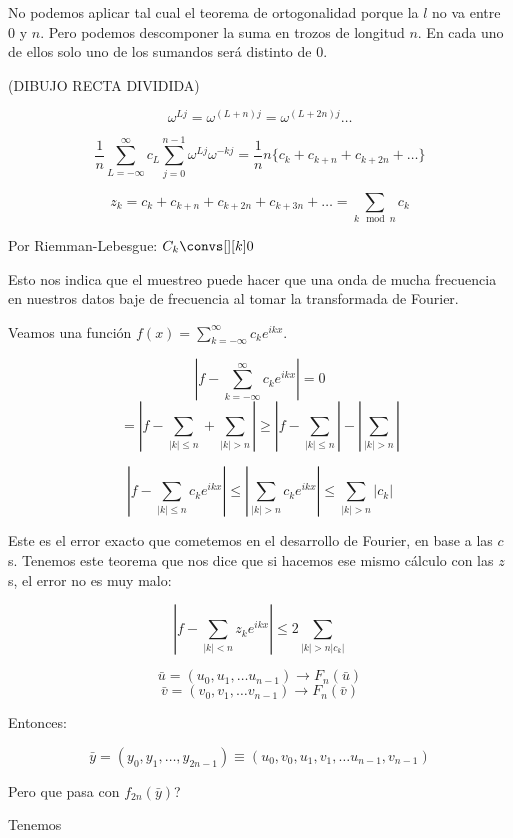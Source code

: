 			No podemos aplicar tal cual el teorema de ortogonalidad porque la $l$ no va entre 0 y $n$. Pero podemos descomponer la suma en trozos de longitud $n$. En cada uno de ellos solo uno de los sumandos será distinto de 0.

			(DIBUJO RECTA DIVIDIDA)


			\[ \omega^{Lj} = \omega^{(L+n)j} = \omega^{(L+2n)j} … \]

			\[ \frac{1}{n} \sum_{L=-\infty}^{\infty} c_L \sum_{j=0}^{n-1} \omega^{Lj} \omega^{-kj} = \frac{1}{n} n \{ c_k + c_{k+n} + c_{k+2n} + … \}  \]

			\[ z_k = c_k + c_{k+n} + c_{k+2n} + c_{k+3n} + … = \sum_{k \mod n} c_k  \]

			Por Riemman-Lebesgue: $C_k \convs[][k] 0$

			Esto nos indica que el muestreo puede hacer que una onda de mucha frecuencia en nuestros datos baje de frecuencia al tomar la transformada de Fourier.


			\obs Veamos una función $f(x) = \sum\limits_{k=-\infty}^{\infty} c_k e^{ikx}$.

			\[ \left|  f - \sum_{k=-\infty}^{\infty} c_k e^{ikx} \right| = 0 \]
			\[ = \left|  f - \sum_{|k|\leq n} + \sum_{|k| > n} \right| \geq \left|  f- \sum_{|k| \leq n} \right| - \left| \sum_{|k| > n} \right| \]

			\[ \left| f- \sum_{|k| \leq n} c_k e^{ikx} \right| \leq \left| \sum_{|k| > n} c_k e^{ikx} \right| \leq \sum_{|k| > n} |c_k|  \]

			Este es el error exacto que cometemos en el desarrollo de Fourier, en base a las $c$s. Tenemos este teorema que nos dice que si hacemos ese mismo cálculo con las $z$s, el error no es muy malo:

			\begin{theorem}
				\[ \left| f - \sum_{|k|< n} z_k e^{ikx}  \right| \leq 2 \sum_{|k| > n |c_k| } \]
			\end{theorem}



			\[ \bar{u} = (u_0, u_1, … u_{n-1}) \rightarrow F_n (\bar{u})  \]
			\[ \bar{v} = (v_0, v_1, … v_{n-1}) \rightarrow F_n (\bar{v})  \]

			Entonces:

			\[ \bar{y} = (y_0,y_1,…,y_{2n-1}) \equiv (u_0,v_0,u_1,v_1, … u_{n-1},v_{n-1})  \]

			Pero que pasa con $f_{2n}(\bar{y})$?

			Tenemos

